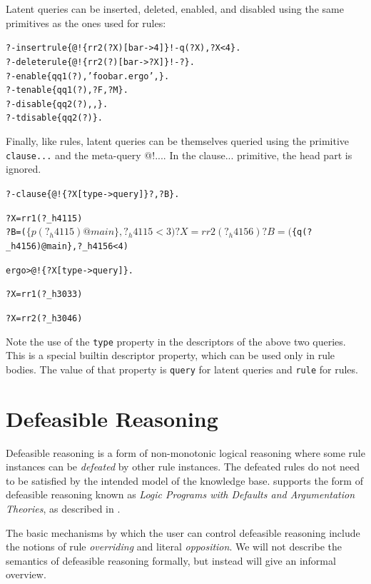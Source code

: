 \documentclass[11pt]{article}
\newcommand{\ERGO}{\mbox{\smaller{\ensuremath{\cal{E}}\smaller{{\sc{RGO}}}}}\xspace}
\newcommand{\FLSYSTEM}{\ERGO}
\newcommand{\prompt}{ergo> }
\newcommand{\ergoext}{ergo\xspace}
\begin{document}
Latent queries can be inserted, deleted, enabled, and disabled using the
same primitives as the ones used for rules:
\begin{alltt}
 ?- insertrule\{@!\{rr2(?X)[bar->4]\} !- q(?X), ?X<4\}.
 ?- deleterule\{@!\{rr2(?)[bar->?X]\} !- ?\}.
 ?- enable\{qq1(?),'foobar.\ergoext',\@\}.
 ?- tenable\{qq1(?),?F,?M\}.
 ?- disable\{qq2(?),\@F,\@\}.
 ?- tdisable\{qq2(?)\}.
\end{alltt}

Finally, like rules, latent queries can be themselves queried using the
primitive \texttt{clause{...}}  and the meta-query @!{...}. In the
clause{...} primitive, the head part is ignored.
\begin{alltt}
  ?- clause\{@!\{?X[type->query]\} ?,?B\}.

  ?X = rr1(?_h4115)
  ?B = ($\{p(?_h4115)@main\}, ?_h4115 < 3)

  ?X = rr2(?_h4156)
  ?B = ($\{q(?_h4156)@main\}, ?_h4156 < 4)

  \prompt @!\{?X[type->query]\}.

  ?X = rr1(?_h3033)

  ?X = rr2(?_h3046)
\end{alltt}
Note the use of the \texttt{type} property in the descriptors of the above
two queries. This is a special builtin descriptor property, which can be
used only in rule bodies. The value of that property is \texttt{query} for
latent queries and \texttt{rule} for rules.  





\section{Defeasible Reasoning}
\label{sec-defeasible}

Defeasible reasoning is a form of non-monotonic logical reasoning where
some rule instances can be \emph{defeated} by other rule instances. The
defeated rules do not need to be satisfied by the intended model of the
knowledge base. \FLSYSTEM supports the form of defeasible reasoning known as
\emph{Logic Programs with Defaults and Argumentation Theories}, as
described in \cite{lpda-iclp-09}.  

The basic mechanisms by which the user can control defeasible
reasoning include the notions of rule \emph{overriding} and literal
\emph{opposition}.  We will not describe the semantics of defeasible
reasoning formally, but instead will give an informal overview.
\end{document}
